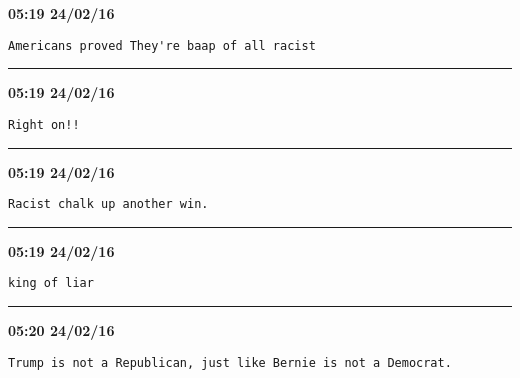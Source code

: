 \begin{adjustwidth}{0cm}{0cm}
\footnotesize \textbf{05:19 24/02/16}

\begin{lstlisting}[breaklines, breakatwhitespace, basicstyle=\small, frame=leftline]
Americans proved They're baap of all racist
\end{lstlisting}
\end{adjustwidth}

\hrule%

\begin{adjustwidth}{0cm}{0cm}
\footnotesize \textbf{05:19 24/02/16}

\begin{lstlisting}[breaklines, breakatwhitespace, basicstyle=\small, frame=leftline]
Right on!!
\end{lstlisting}
\end{adjustwidth}

\hrule%

\begin{adjustwidth}{0cm}{0cm}
\footnotesize \textbf{05:19 24/02/16}

\begin{lstlisting}[breaklines, breakatwhitespace, basicstyle=\small, frame=leftline]
Racist chalk up another win.
\end{lstlisting}
\end{adjustwidth}

\hrule%

\begin{adjustwidth}{0cm}{0cm}
\footnotesize \textbf{05:19 24/02/16}

\begin{lstlisting}[breaklines, breakatwhitespace, basicstyle=\small, frame=leftline]
king of liar
\end{lstlisting}
\end{adjustwidth}

\hrule%

\begin{adjustwidth}{0cm}{0cm}
\footnotesize \textbf{05:20 24/02/16}

\begin{lstlisting}[breaklines, breakatwhitespace, basicstyle=\small, frame=leftline]
Trump is not a Republican, just like Bernie is not a Democrat.
\end{lstlisting}
\end{adjustwidth}


